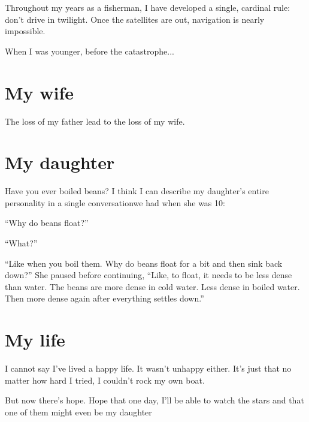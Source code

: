 Throughout my years as a fisherman, I have developed a single, cardinal rule: don't drive in twilight.
Once the satellites are out, navigation is nearly impossible.

When I was younger, before the catastrophe...


\section{My wife}

The loss of my father lead to the loss of my wife.


\section{My daughter}

Have you ever boiled beans?
I think I can describe my daughter's entire personality in a single conversationwe had when she was 10:

``Why do beans float?''

``What?''

``Like when you boil them. Why do beans float for a bit and then sink back down?'' She paused before continuing, ``Like, to float, it needs to be less dense than water. The beans are more dense in cold water. Less dense in boiled water. Then more dense again after everything settles down.''


\section{My life}

I cannot say I've lived a happy life.
It wasn't unhappy either.
It's just that no matter how hard I tried, I couldn't rock my own boat.

But now there's hope.
Hope that one day, I'll be able to watch the stars and that one of them might even be my daughter
